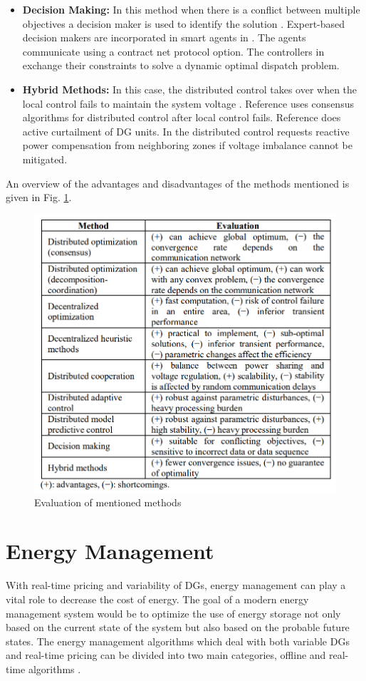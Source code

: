 \begin{itemize}
    \item \textbf{Decision Making:} In this method when there is a conflict between multiple objectives a decision maker is used to identify the solution \cite{Kyrue}. Expert-based decision makers are incorporated in smart agents in \cite{HEF12, HEF13}. The agents communicate using a contract net protocol option. The controllers in \cite{MEC13} exchange their constraints to solve a dynamic optimal dispatch problem.
    \item \textbf{Hybrid Methods:} In this case, the distributed control takes over when the local control fails to maintain the system voltage \cite{Kyrue}. Reference \cite{GMo13,YWa16} uses consensus algorithms for distributed control after local control fails. Reference \cite{DRe13} does active curtailment of DG units. In \cite{BAR13} the distributed control requests reactive power compensation from neighboring zones if voltage imbalance cannot be mitigated.
\end{itemize}
An overview of the advantages and disadvantages of the methods mentioned is given in Fig. \ref{fig:DIS_CVC}.
\begin{figure}[!h]
\centering
\includegraphics[width=0.85\linewidth]{figs/DIS_CVC.png}
\caption[Evaluation of mentioned methods]{Evaluation of mentioned methods \cite{Kyrue}}
\label{fig:DIS_CVC}
\end{figure}

\section{Energy Management}
With real-time pricing and variability of DGs, energy management can play a vital role to decrease the cost of energy. The goal of a modern energy management system would be to optimize the use of energy storage not only based on the current state of the system but also based on the probable future states. The energy management algorithms which deal with both variable DGs and real-time pricing can be divided into two main categories, offline and real-time algorithms \cite{Wen17}. 
